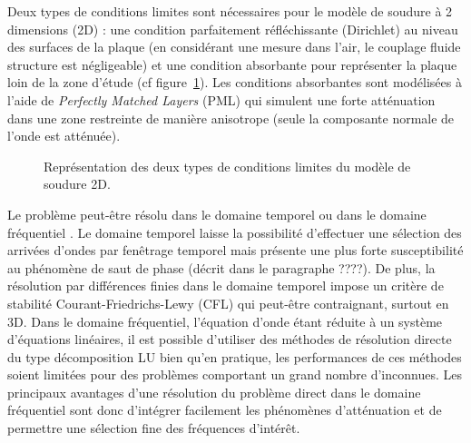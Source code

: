 Deux types de conditions limites sont nécessaires pour le modèle de soudure à 2 dimensions (2D) : une condition parfaitement réfléchissante (Dirichlet) au niveau des surfaces de la plaque (en considérant une mesure dans l'air, le couplage fluide structure est négligeable) et une condition absorbante pour représenter la plaque loin de la zone d'étude (cf figure~\ref{BC}). Les conditions absorbantes sont modélisées à l'aide de \emph{Perfectly Matched Layers} (PML) qui simulent une forte atténuation dans une zone restreinte de manière anisotrope (seule la composante normale de l'onde est atténuée).

\begin{figure}[!h]
	\centering
	\caption{Représentation des deux types de conditions limites du modèle de soudure 2D.\label{BC}}
\end{figure}


Le problème peut-être résolu dans le domaine temporel ou dans le domaine fréquentiel \citep{vigh_2008}. Le domaine temporel laisse la possibilité d'effectuer une sélection des arrivées d'ondes par fenêtrage temporel mais présente une plus forte susceptibilité au phénomène de saut de phase (décrit dans le paragraphe ????).  De plus, la résolution par différences finies dans le domaine temporel impose un critère de stabilité Courant-Friedrichs-Lewy (CFL) qui peut-être contraignant, surtout en 3D. Dans le domaine fréquentiel, l'équation d'onde étant réduite à un système d'équations linéaires, il est possible d'utiliser des méthodes de résolution directe du type décomposition LU bien qu'en pratique, les performances de ces méthodes soient limitées pour des problèmes comportant un grand nombre d'inconnues.  Les principaux avantages d'une résolution du problème direct dans le domaine fréquentiel sont donc d'intégrer facilement les phénomènes d'atténuation et de permettre une sélection fine des fréquences d'intérêt. \\~\\







